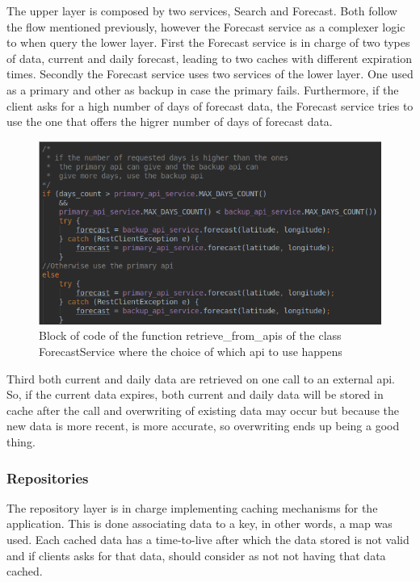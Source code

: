 \documentclass[12pt]{article}
\begin{document}
The upper layer is composed by two services, Search and Forecast. Both follow the flow mentioned
  previously, however the Forecast service as a complexer logic to when query the lower layer. First
  the Forecast service is in charge of two types of data, current and daily forecast, leading to
  two caches with different expiration times. Secondly the Forecast service uses two services
  of the lower layer. One used as a primary and other as backup in case the primary fails. Furthermore,
  if the client asks for a high number of days of forecast data, the Forecast service tries to use the
  one that offers the higrer number of days of forecast data.

\begin{figure}[h]
  \center
  \includegraphics[scale=0.5]{primary_backup_apis.png}
  \caption{Block of code of the function retrieve\_from\_apis of the class ForecastService where
    the choice of which api to use happens}
\end{figure}

  Third both current and daily data are retrieved on one call to an external api. So, if the
  current data expires, both current and daily data will be stored in cache after the call
  and overwriting of existing data may occur but because the new data is more recent, is more
  accurate, so overwriting ends up being a good thing.

\subsubsection{Repositories}

The repository layer is in charge implementing caching mechanisms for the application. This is done
  associating data to a key, in other words, a map was used. Each cached data has a time-to-live
  after which the data stored is not valid and if clients asks for that data, should consider as not
  not having that data cached.
\end{document}
